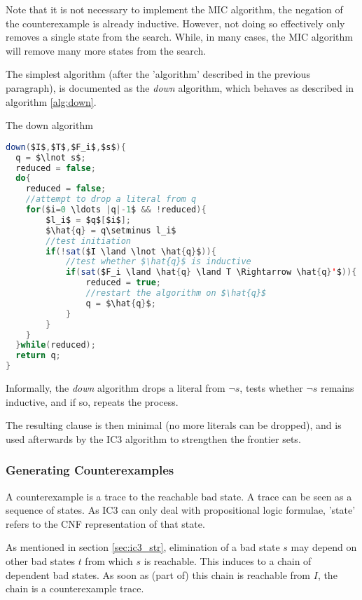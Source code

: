 \documentclass[a4paper]{article}
\begin{document}
Note that it is not necessary to implement the MIC algorithm, the negation of the counterexample is already inductive. However, not doing so effectively only removes a single state from the search. While, in many cases, the MIC algorithm will remove many more states from the search.

The simplest algorithm (after the 'algorithm' described in the previous paragraph), is documented as the \emph{down} algorithm, which behaves as described in algorithm \ref{alg:down}.

\begin{algorithm}
\caption{The down algorithm}
\label{alg:down}
\begin{lstlisting}[mathescape,language=Java]
down($I$,$T$,$F_i$,$s$){
  q = $\lnot s$;
  reduced = false;
  do{
  	reduced = false;
  	//attempt to drop a literal from q
  	for($i=0 \ldots |q|-1$ && !reduced){
  		$l_i$ = $q$[$i$];
	  	$\hat{q} = q\setminus l_i$ 
	  	//test initiation
	  	if(!sat($I \land \lnot \hat{q}$)){
	  		//test whether $\hat{q}$ is inductive
	  		if(sat($F_i \land \hat{q} \land T \Rightarrow \hat{q}'$)){
	  			reduced = true;
	  			//restart the algorithm on $\hat{q}$
	  			q = $\hat{q}$;
			}	  		
	  	}
  	}
  }while(reduced);
  return q;
}
\end{lstlisting}
\end{algorithm}

Informally, the \emph{down} algorithm drops a literal from $\lnot s$, tests whether $\lnot s$ remains inductive, and if so, repeats the process.

The resulting clause is then minimal \cite{Hassan2013} (no more literals can be dropped), and is used afterwards by the IC3 algorithm to strengthen the frontier sets.

\subsubsection{Generating Counterexamples}
A counterexample is a trace to the reachable bad state. A trace can be seen as a sequence of states. As IC3 can only deal with propositional logic formulae, 'state' refers to the CNF representation of that state.

As mentioned in section \ref{sec:ic3_str}, elimination of a bad state $s$ may depend on other bad states $t$ from which $s$ is reachable. This induces to a chain of dependent bad states. As soon as (part of) this chain is reachable from $I$, the chain is a counterexample trace.

\newpage
\end{document}
